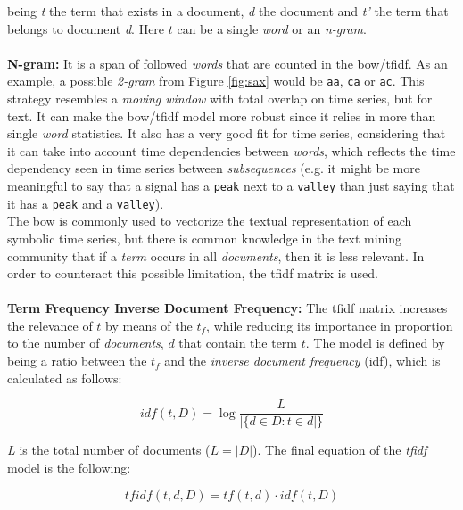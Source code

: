 being \textit{t} the term that exists in a document, \textit{d} the document and \textit{t'} the term that belongs to document \textit{d}. Here $t$ can be a single \textit{word} or an \textit{n-gram}.\\\\
\textbf{N-gram:} It is a span of followed \textit{words} that are counted in the \gls{bow}/\gls{tfidf}. As an example, a possible \textit{2-gram} from Figure \ref{fig:sax} would be \texttt{aa}, \texttt{ca} or \texttt{ac}. This strategy resembles a \textit{moving window} with total overlap on time series, but for text. It can make the \gls{bow}/\gls{tfidf} model more robust since it relies in more than single \textit{word} statistics. It also has a very good fit for time series, considering that it can take into account time dependencies between \textit{words}, which reflects the time dependency seen in time series between \textit{subsequences} (e.g. it might be more meaningful to say that a signal has a \texttt{peak} next to a \texttt{valley} than just saying that it has a \texttt{peak} and a \texttt{valley}).\\

The \gls{bow} is commonly used to vectorize the textual representation of each symbolic time series, but there is common knowledge in the text mining community that if a \textit{term} occurs in all \textit{documents}, then it is less relevant. In order to counteract this possible limitation, the \gls{tfidf} matrix is used.\\\\
\textbf{Term Frequency Inverse Document Frequency:} The \gls{tfidf} matrix increases the relevance of $t$ by means of the $t_f$, while reducing its importance in proportion to the number of \textit{documents}, $d$ that contain the term $t$. The model is defined by being a ratio between the $t_f$ and the \textit{inverse document frequency} (idf), which is calculated as follows:

\begin{equation}
\label{eq:idf}
    idf(t, D) = \log{\frac{L}{|\{d \in D: t \in d|\}}}
\end{equation}

\textit{L} is the total number of documents ($L = |D|$). The final equation of the \textit{tfidf} model is the following:

\begin{equation}
\label{eqn:tfidf}
    tfidf(t, d, D) = tf(t, d) \cdot idf(t, D) 
\end{equation}

